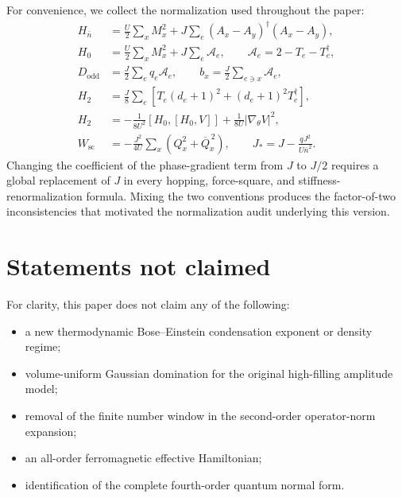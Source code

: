 \documentclass[11pt]{article}
\newcommand{\nbar}{\bar n}
\newcommand{\cA}{\mathcal A}
\begin{document}
For convenience, we collect the normalization used throughout the paper:
\begin{align}
H_{\nbar}
&=\frac U2\sum_xM_x^2
+J\sum_e(A_x-A_y)^\dagger(A_x-A_y),
\label{eq:audit1}\\
H_0
&=\frac U2\sum_xM_x^2+J\sum_e\cA_e,
\qquad
\cA_e=2-T_e-T_e^\dagger,
\label{eq:audit2}\\
D_{\mathrm{odd}}
&=\frac J2\sum_eq_e\cA_e,
\qquad
b_x=\frac J2\sum_{e\ni x}\cA_e,
\label{eq:audit3}\\
H_2
&=\frac J8\sum_e\left[T_e(d_e+1)^2+(d_e+1)^2T_e^\dagger\right],
\label{eq:audit4}\\
H_2
&=-\frac1{8U^2}[H_0,[H_0,V]]
+\frac1{8U}|\nabla_\theta V|^2,
\label{eq:audit5}\\
W_{\mathrm{sc}}
&=-\frac{J^2}{4U}\sum_x(Q_x^2+\overline Q_x^{\,2}),
\qquad
J_*=J-\frac{qJ^2}{U\nbar^2}.
\label{eq:audit6}
\end{align}
Changing the coefficient of the phase-gradient term from $J$ to $J/2$ requires a global replacement of $J$ in every hopping, force-square, and stiffness-renormalization formula. Mixing the two conventions produces the factor-of-two inconsistencies that motivated the normalization audit underlying this version.

\section{Statements not claimed}

For clarity, this paper does not claim any of the following:
\begin{itemize}
    \item a new thermodynamic Bose--Einstein condensation exponent or density regime;
    \item volume-uniform Gaussian domination for the original high-filling amplitude model;
    \item removal of the finite number window in the second-order operator-norm expansion;
    \item an all-order ferromagnetic effective Hamiltonian;
    \item identification of the complete fourth-order quantum normal form.
\end{itemize}



\end{document}
